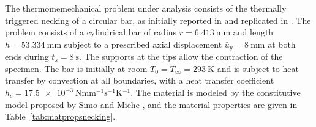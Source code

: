      The thermomemechanical problem under analysis consists of the thermally triggered necking of a circular bar, as initially reported in \cite{simo_associative_1992} and replicated in \cite{danowski_computational_2014}.
     The problem consists of a cylindrical bar of radius $r=\SI{6.413}{\milli\meter}$ and length $h=\SI{53.334}{\milli\meter}$ subject to a prescribed axial displacement $\bar{u}_{y}=\SI{8}{\milli\meter}$ at both ends during $t_s=\SI{8}{\second}$.
     The supports at the tips allow the contraction of the specimen.
     The bar is initially at room $T_{0}=T_{\infty}=\SI{293}{\kelvin}$ and is subject to heat transfer by convection at all boundaries, with a heat transfer coefficient $h_{c} = \SI{17.5e-3}{\newton\milli\meter^{-1}\second^{-1}\kelvin^{-1}}$.
     The material is modeled by the constitutive model proposed by Simo and Miehe \citep{simo_associative_1992}, and the material properties are given in Table~\ref{tab:matpropsnecking}.
